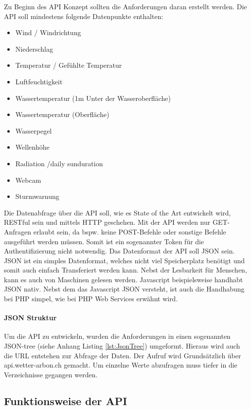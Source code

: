 Zu Beginn des API Konzept sollten die Anforderungen daran erstellt werden. Die API soll mindestens folgende Datenpunkte enthalten:
\begin{itemize}
\item Wind / Windrichtung
\item Niederschlag
\item Temperatur / Gefühlte Temperatur
\item Luftfeuchtigkeit
\item Wassertemperatur (1m Unter der Wasseroberfläche)
\item Wassertemperatur (Oberfläche)
\item Wasserpegel
\item Wellenhöhe
\item Radiation /daily sunduration
\item Webcam
\item Sturmwarnung
\end{itemize}
Die Datenabfrage über die API soll, wie es State of the Art entwickelt wird, RESTful sein und mittels HTTP geschehen. Mit der API werden nur GET-Anfragen erlaubt sein, da bspw. keine POST-Befehle oder sonstige Befehle ausgeführt werden müssen. Somit ist ein sogenannter Token für die Authentifizierung nicht notwendig. Das Datenformat der API soll JSON sein. JSON ist ein simples Datenformat, welches nicht viel Speicherplatz benötigt und somit auch einfach Transferiert werden kann. Nebst der Lesbarkeit für Menschen, kann es auch von Maschinen gelesen werden. Javascript beispielsweise handhabt JSON nativ. Nebst dem das Javascript JSON versteht, ist auch die Handhabung bei PHP simpel, wie bei PHP Web Services \cite{LornaJaneMitchell2013oreilly} erwähnt wird. 

\paragraph{JSON Struktur}

Um die API zu entwickeln, wurden die Anforderungen in einen sogenannten JSON-tree (siehe Anhang Listing \ref{lst:JsonTree}) umgeformt. Hieraus wird auch die URL entstehen zur Abfrage der Daten. Der Aufruf wird Grundsätzlich über api.wetter-arbon.ch gemacht. Um einzelne Werte abzufragen muss tiefer in die Verzeichnisse gegangen werden.


\subsection{Funktionsweise der API}


